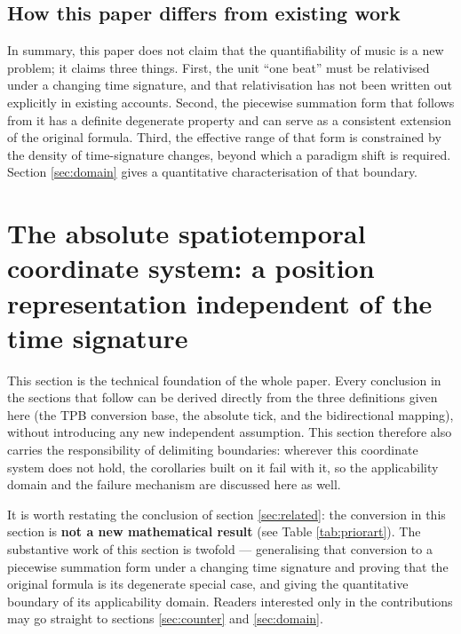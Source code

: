 \documentclass[11pt,a4paper]{article}
\begin{document}
\subsection{How this paper differs from existing work}

In summary, this paper does not claim that the quantifiability of music is a new
problem; it claims three things. First, the unit ``one beat'' must be relativised under
a changing time signature, and that relativisation has not been written out explicitly
in existing accounts. Second, the piecewise summation form that follows from it has a
definite degenerate property and can serve as a consistent extension of the original
formula. Third, the effective range of that form is constrained by the density of
time-signature changes, beyond which a paradigm shift is required.
Section \ref{sec:domain} gives a quantitative characterisation of that boundary.

\section{The absolute spatiotemporal coordinate system: a position representation independent of the time signature}
\label{sec:coord}

This section is the technical foundation of the whole paper. Every conclusion in the
sections that follow can be derived directly from the three definitions given here
(the TPB conversion base, the absolute tick, and the bidirectional mapping), without
introducing any new independent assumption. This section therefore also carries the
responsibility of delimiting boundaries: wherever this coordinate system does not hold,
the corollaries built on it fail with it, so the applicability domain and the failure
mechanism are discussed here as well.

It is worth restating the conclusion of section \ref{sec:related}: the conversion in
this section is \textbf{not a new mathematical result} (see Table \ref{tab:priorart}).
The substantive work of this section is twofold --- generalising that conversion to a
piecewise summation form under a changing time signature and proving that the original
formula is its degenerate special case, and giving the quantitative boundary of its
applicability domain. Readers interested only in the contributions may go straight to
sections \ref{sec:counter} and \ref{sec:domain}.
\end{document}
